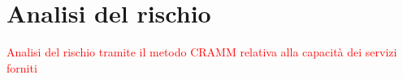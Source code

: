 \newpage

\section{Analisi del rischio}\label{ref:rischio}

\textcolor{red}{Analisi del rischio tramite il metodo CRAMM relativa alla capacità dei servizi forniti}